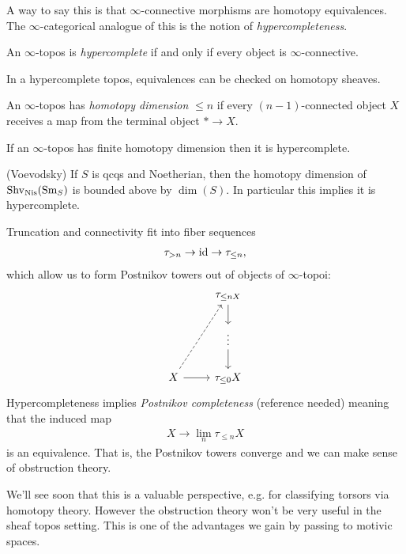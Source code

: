 \documentclass[11pt]{amsart}
\begin{document}
A way to say this is that $\infty$-connective morphisms are homotopy equivalences. The $\infty$-categorical analogue of this is the notion of \textit{hypercompleteness}.

\begin{definition} An $\infty$-topos is \textit{hypercomplete} if and only if every object is $\infty$-connective.
\end{definition}

\begin{upshot} In a hypercomplete topos, equivalences can be checked on homotopy sheaves.
\end{upshot}

\begin{definition} \cite[7.2.11]{HTT} An $\infty$-topos has \textit{homotopy dimension} $\le n$ if every $(n-1)$-connected object $X$ receives a map from the terminal object $\ast \to X$.
\end{definition}

\begin{theorem} If an $\infty$-topos has finite homotopy dimension then it is hypercomplete.
\end{theorem}

\begin{theorem} (Voevodsky) If $S$ is qcqs and Noetherian, then the homotopy dimension of $\mathrm{Shv}_{\mathrm{Nis}}(\mathrm{Sm}_S)$ is bounded above by $\dim(S)$. In particular this implies it is hypercomplete.
\end{theorem}

Truncation and connectivity fit into fiber sequences
\begin{align*}
    \tau_{>n} \to \mathrm{id} \to \tau_{\le n},
\end{align*}
which allow us to form Postnikov towers out of objects of $\infty$-topoi:
\[ \begin{tikzcd}
    & \tau_{\le n X}\dar \\
    & \vdots\dar\\
    X\rar\ar[uur,dashed] & \tau_{\le 0} X
\end{tikzcd} \]
Hypercompleteness implies \textit{Postnikov completeness} (reference needed) meaning that the induced map
\begin{align*}
    X \to \lim_n \tau_{\le n} X
\end{align*}
is an equivalence. That is, the Postnikov towers converge and we can make sense of obstruction theory.

We'll see soon that this is a valuable perspective, e.g. for classifying torsors via homotopy theory. However the obstruction theory won't be very useful in the sheaf topos setting. This is one of the advantages we gain by passing to motivic spaces.
\end{document}
